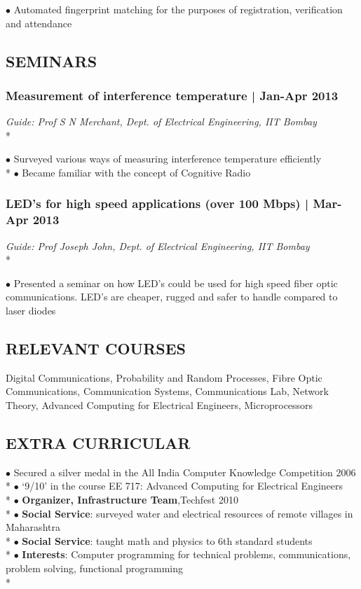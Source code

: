 \documentclass[12pt]{article}
\begin{document}
\noindent $\bullet$ Automated fingerprint matching for the purposes of registration, verification and attendance
 

\subsection*{\uppercase{Seminars}}
\subsubsection*{Measurement of interference temperature | Jan-Apr 2013} 

\emph{Guide: Prof S N Merchant, Dept. of Electrical Engineering, IIT Bombay} \\*
  
\noindent $\bullet$ Surveyed various ways of measuring interference temperature efficiently \\*
$\bullet$ Became familiar with the concept of Cognitive Radio
 

\subsubsection*{LED's for high speed applications (over 100 Mbps) | Mar-Apr 2013}

\emph{Guide: Prof Joseph John, Dept. of Electrical Engineering, IIT Bombay} \\*
  
\noindent $\bullet$ Presented a seminar on how LED's could be used for high speed fiber optic communications. LED's are cheaper, rugged and safer to handle compared to laser diodes
 

\subsection*{\uppercase{RELEVANT COURSES}}

Digital Communications, Probability and Random Processes, Fibre Optic Communications, 
Communication Systems, Communications Lab, Network Theory,
Advanced Computing for Electrical Engineers, Microprocessors

\subsection*{\uppercase{Extra curricular}}

  
\noindent $\bullet$ Secured a silver medal in the All India Computer Knowledge Competition 2006 \\*
$\bullet$ `9/10' in the course EE 717: Advanced Computing for Electrical Engineers \\*
$\bullet$ \textbf{Organizer, Infrastructure Team},Techfest 2010 \\*
$\bullet$ \textbf{Social Service}: surveyed water and electrical resources of remote villages in Maharashtra \\*
$\bullet$ \textbf{Social Service}: taught math and physics to 6th standard students \\*
$\bullet$ \textbf{Interests}:  Computer programming for technical problems, communications, problem solving, functional programming \\*
\end{document}
